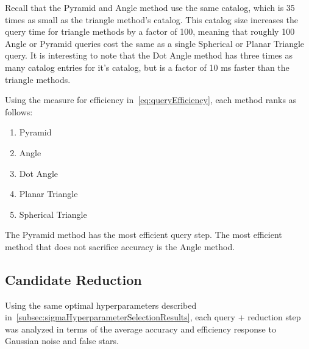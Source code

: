 Recall that the Pyramid and Angle method use the same catalog, which is 35 times as small as the triangle method's
catalog.
This catalog size increases the query time for triangle methods by a factor of 100, meaning that roughly 100 Angle or
Pyramid queries cost the same as a single Spherical or Planar Triangle query.
It is interesting to note that the Dot Angle method has three times as many catalog entries for it's catalog, but is a
factor of 10 ms faster than the triangle methods.

Using the measure for efficiency in~\autoref{eq:queryEfficiency}, each method ranks as follows:
\begin{multicols}{2}
    \begin{enumerate}
        \item Pyramid
        \item Angle
        \item Dot Angle
        \item Planar Triangle
        \item Spherical Triangle
    \end{enumerate}
\end{multicols}

The Pyramid method has the most efficient query step.
The most efficient method that does not sacrifice accuracy is the Angle method.

\subsection{Candidate Reduction}\label{subsec:candidateReductionResults}
Using the same optimal hyperparameters described in~\autoref{subsec:sigmaHyperparameterSelectionResults}, each query +
reduction step was analyzed in terms of the average accuracy and efficiency response to Gaussian noise and false stars.

\begin{figure}
\end{figure}

